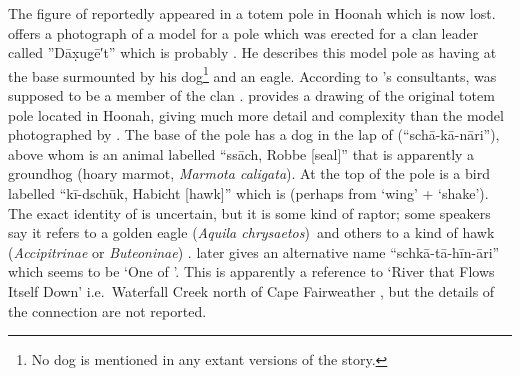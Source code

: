 The figure of  reportedly appeared in a totem pole in Hoonah which is now lost.
\citeauthor{swanton:1908} offers a photograph of a model for a pole which was erected for a  clan leader called ”Dāx̣ug̣ē′t” which is probably  \parencite[431 fig.\ 109]{swanton:1908}.
He describes this model pole as having  at the base surmounted by his dog\footnote{No dog is mentioned in any extant versions of the  story.} and an eagle.
According to \citeauthor{swanton:1908}’s consultants,  was supposed to be a member of the  clan \parencite[432]{swanton:1908}.
\citeauthor{krause:1885} provides a drawing of the original totem pole located in Hoonah, giving much more detail and complexity than the model photographed by \citeauthor{swanton:1909} \parencites[132]{krause:1885}[94]{krause:1956}.
The base of the pole has a dog in the lap of  (“schā-kā-nāri”), above whom is an animal labelled “ssāch, Robbe [seal]” that is apparently a groundhog  (hoary marmot, \textit{Marmota caligata}).
At the top of the pole is a bird labelled “kī-dschūk, Habicht [hawk]” which is  (perhaps from  ‘wing’ +  ‘shake’).
The exact identity of  is uncertain, but it is some kind of raptor; some speakers say it refers to a golden eagle (\textit{Aquila chrysaetos})\ and others to a kind of hawk (\textit{Accipitrinae} or \textit{Buteoninae}) .
\citeauthor{krause:1885} later gives  an alternative name “schkā-tā-hīn-āri” \parencites[380]{krause:1885}[251]{krause:1956} which seems to be  ‘One of ’.
This is apparently a reference to  ‘River that Flows Itself Down’ i.e.\ Waterfall Creek north of Cape Fairweather \parencite[25 \#289, 40 \#31]{thornton:2012}, but the details of the connection are not reported.

